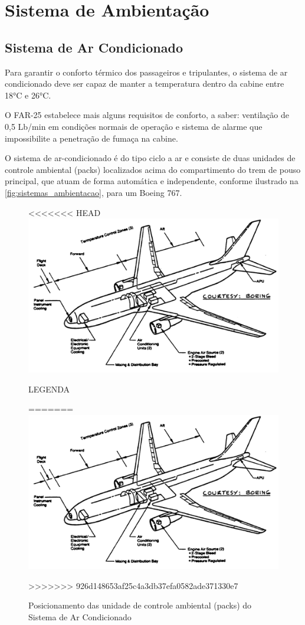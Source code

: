 \section{Sistema de Ambientação}

\subsection{Sistema de Ar Condicionado}

Para garantir o conforto térmico dos passageiros e tripulantes, o sistema de ar condicionado deve ser capaz de manter a temperatura dentro da cabine entre 18°C e 26°C.

O FAR-25 estabelece mais alguns requisitos de conforto, a saber: ventilação de 0,5 Lb/min em condições normais de operação e sistema de alarme que impossibilite a penetração de fumaça na cabine.

O sistema de ar-condicionado é do tipo ciclo a ar e consiste de duas unidades de controle ambiental (packs) localizados acima do compartimento do trem de pouso principal, que atuam de forma automática e independente, conforme ilustrado na \autoref{fig:sistemas_ambientacao}, para um Boeing 767.

\begin{figure}
<<<<<<< HEAD
\centering
\includegraphics{images/parte3/sistemas_ambientacao.png}
\caption{LEGENDA}
=======
\includegraphics[width=\textwidth]{images/parte3/sistemas_ambientacao.png}
\caption{Posicionamento das unidade de controle ambiental (packs) do Sistema de Ar Condicionado}
>>>>>>> 926d148653af25c4a3db37efa0582ade371330e7
\label{fig:sistemas_ambientacao}
\end{figure}

